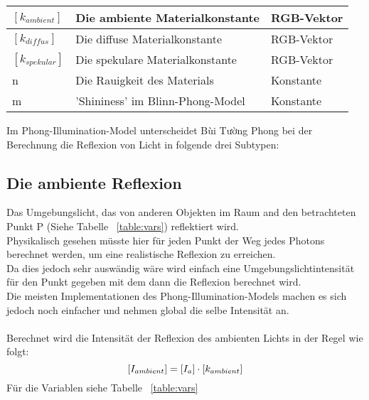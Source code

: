 \documentclass[a4paper]{scrartcl}%
\begin{document}
\begin{table}[H]
\begin{tabular}{l|l|l}
            $[k_{ambient}]$                    & Die ambiente Materialkonstante                         & RGB-Vektor               \\ \hline
            $[k_{diffus}]$                     & Die diffuse Materialkonstante                          & RGB-Vektor               \\ \hline
            $[k_{spekular}]$                   & Die spekulare Materialkonstante                        & RGB-Vektor              \\ \hline
            n                   & Die Rauigkeit des Materials                        & Konstante              \\ \hline
            m                   & 'Shininess' im Blinn-Phong-Model                        & Konstante
        \end{tabular}
        \end{table}
    
    

    Im Phong-Illumination-Model \footnotemark[2] unterscheidet Bùi Tường Phong bei der Berechnung die Reflexion von Licht in folgende drei Subtypen:\\

    \subsection{Die ambiente Reflexion}%
    \label{sub:die_ambiente_reflexion}
        Das Umgebungslicht, das von anderen Objekten im Raum and den betrachteten Punkt P (Siehe Tabelle ~\ref{table:vars}) reflektiert wird.\\
        Physikalisch gesehen müsste hier für jeden Punkt der Weg jedes Photons berechnet werden, um eine realistische Reflexion zu erreichen.\\
        Da dies jedoch sehr auswändig wäre wird einfach eine Umgebungslichtintensität für den Punkt gegeben mit dem dann die Reflexion berechnet wird.\\
        Die meisten Implementationen des Phong-Illumination-Models machen es sich jedoch noch einfacher und nehmen global die selbe Intensität an.\\
        \\Berechnet wird die Intensität der Reflexion des ambienten Lichts in der Regel wie folgt:\\
        \begin{equation}
            \label{eq:amb}
                [I_{ambient}] = [I_a] \cdot [k_{ambient}]\\
        \end{equation}
        Für die Variablen siehe Tabelle ~\ref{table:vars}\\
\end{document}
